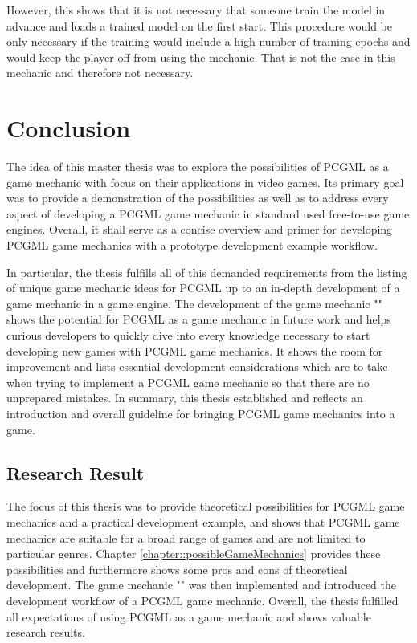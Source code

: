 \documentclass[MGS,Master,english]{twbook}%
\begin{document}
However, this shows that it is not necessary that someone train the model in advance and loads a trained model on the first start. This procedure would be only necessary if the training would include a high number of training epochs and would keep the player off from using the mechanic. That is not the case in this mechanic and therefore not necessary.

%
%
\clearpage
\chapter{Conclusion}
The idea of this master thesis was to explore the possibilities of PCGML as a game mechanic with focus on their applications in video games. Its primary goal was to provide a demonstration of the possibilities as well as to address every aspect of developing a PCGML game mechanic in standard used free-to-use game engines. Overall, it shall serve as a concise overview and primer for developing PCGML game mechanics with a prototype development example workflow.

In particular, the thesis fulfills all of this demanded requirements from the listing of unique game mechanic ideas for PCGML up to an in-depth development of a game mechanic in a game engine. The development of the game mechanic "" shows the potential for PCGML as a game mechanic in future work and helps curious developers to quickly dive into every knowledge necessary to start developing new games with PCGML game mechanics. It shows the room for improvement and lists essential development considerations which are to take when trying to implement a PCGML game mechanic so that there are no unprepared mistakes. In summary, this thesis established and reflects an introduction and overall guideline for bringing PCGML game mechanics into a game.

\section{Research Result}
The focus of this thesis was to provide theoretical possibilities for PCGML game mechanics and a practical development example, and shows that PCGML game mechanics are suitable for a broad range of games and are not limited to particular genres. Chapter \ref{chapter::possibleGameMechanics} provides these possibilities and furthermore shows some pros and cons of theoretical development. The game mechanic "" was then implemented and introduced the development workflow of a PCGML game mechanic. Overall, the thesis fulfilled all expectations of using PCGML as a game mechanic and shows valuable research results.
\end{document}
